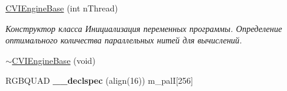 \begin{DoxyCompactItemize}
\item 
\hyperlink{class_c_v_i_engine_base_a1349de29adc90869f463b17fb03904c1}{C\+V\+I\+Engine\+Base} (int n\+Thread)
\begin{DoxyCompactList}\small\item\em Конструктор класса Инициализация переменных программы. Определение оптимального количества параллельных нитей для вычислений. \end{DoxyCompactList}\item 
\hyperlink{class_c_v_i_engine_base_a28dba2a06eda33294836c5241f497112}{$\sim$\+C\+V\+I\+Engine\+Base} (void)
\item 
\hypertarget{class_c_v_i_engine_base_acd0542a6476a6eed4568c900ab5af5d9}{R\+G\+B\+Q\+U\+A\+D {\bfseries \+\_\+\+\_\+declspec} (align(16)) m\+\_\+pal\+I\mbox{[}256\mbox{]}}\label{class_c_v_i_engine_base_acd0542a6476a6eed4568c900ab5af5d9}


\end{DoxyCompactItemize}
